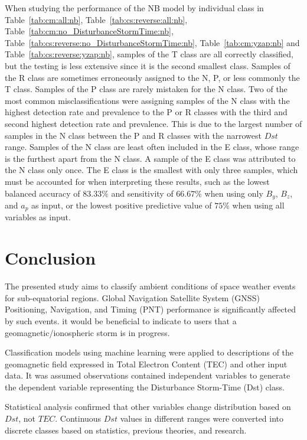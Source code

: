 \documentclass[sn-mathphys-num]{sn-jnl}%
\begin{document}
When studying the performance of the NB model by individual class in Table~\ref{tab:cm:all:nb}, Table~\ref{tab:cs:reverse:all:nb}, Table~\ref{tab:cm:no_DisturbanceStormTime:nb}, Table~\ref{tab:cs:reverse:no_DisturbanceStormTime:nb}, Table~\ref{tab:cm:yzap:nb} and Table~\ref{tab:cs:reverse:yzap:nb}, samples of the T class are all correctly classified, but the testing is less extensive since it is the second smallest class. Samples of the R class are sometimes erroneously assigned to the N, P, or less commonly the T class. Samples of the P class are rarely mistaken for the N class. Two of the most common misclassifications were assigning samples of the N class with the highest detection rate and prevalence to the P or R classes with the third and second highest detection rate and prevalence. This is due to the largest number of samples in the N class between the P and R classes with the narrowest $Dst$ range. Samples of the N class are least often included in the E class, whose range is the furthest apart from the N class. A sample of the E class was attributed to the N class only once. The E class is the smallest with only three samples, which must be accounted for when interpreting these results, such as the lowest balanced accuracy of $83.33\%$ and sensitivity of $66.67\%$ when using only $B_{y}$, $B_{z}$, and $a_{p}$ as input, or the lowest positive predictive value of $75\%$ when using all variables as input.

\section{Conclusion}
\label{sec:Conclusion}

The presented study aims to classify ambient conditions of space weather events for sub-equatorial regions. Global Navigation Satellite System (GNSS) Positioning, Navigation, and Timing (PNT) performance is significantly affected by such events. it would be beneficial to indicate to users that a geomagnetic/ionospheric storm is in progress. 

Classification models using machine learning were applied to descriptions of the geomagnetic field expressed in Total Electron Content (TEC) and other input data. It was assumed observations contained independent variables to generate the dependent variable representing the Disturbance Storm-Time (Dst) class. 

Statistical analysis confirmed that other variables change distribution based on $Dst$, not $TEC$. Continuous $Dst$ values in different ranges were converted into discrete classes based on statistics, previous theories, and research. 
\end{document}
